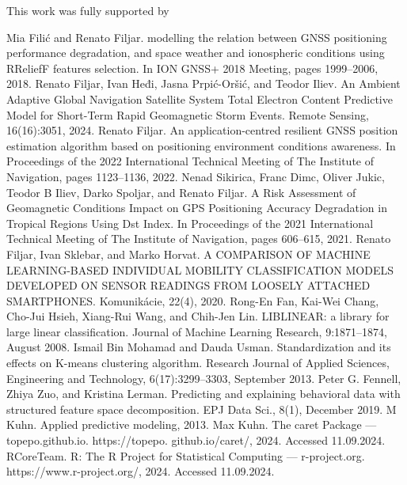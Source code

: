 \documentclass[preprint,12pt]{elsarticle}
\begin{document}
This work was fully supported by

\begin{thebibliography}{000}
 Mia Filić and Renato Filjar. modelling the relation between GNSS positioning performance degradation, and space weather and ionospheric conditions using RReliefF features selection. In ION GNSS+ 2018 Meeting, pages 1999–2006, 2018. 
 Renato Filjar, Ivan Heđi, Jasna Prpić-Oršić, and Teodor Iliev. An Ambient Adaptive Global Navigation Satellite System Total Electron Content Predictive Model for Short-Term Rapid Geomagnetic Storm Events. Remote Sensing, 16(16):3051, 2024. 
 Renato Filjar. An application-centred resilient GNSS position estimation algorithm based on positioning environment conditions awareness. In Proceedings of the 2022 International Technical Meeting of The Institute of Navigation, pages 1123–1136, 2022. 
 Nenad Sikirica, Franc Dimc, Oliver Jukic, Teodor B Iliev, Darko Spoljar, and Renato Filjar. A Risk Assessment of Geomagnetic Conditions Impact on GPS Positioning Accuracy Degradation in Tropical Regions Using Dst Index. In Proceedings of the 2021 International Technical Meeting of The Institute of Navigation, pages 606–615, 2021. 
 Renato Filjar, Ivan Sklebar, and Marko Horvat. A COMPARISON OF MACHINE LEARNING-BASED INDIVIDUAL MOBILITY CLASSIFICATION MODELS DEVELOPED ON SENSOR READINGS FROM LOOSELY ATTACHED SMARTPHONES. Komunikácie, 22(4), 2020. 
 Rong-En Fan, Kai-Wei Chang, Cho-Jui Hsieh, Xiang-Rui Wang, and Chih-Jen Lin. LIBLINEAR: a library for large linear classification. Journal of Machine Learning Research, 9:1871–1874, August 2008. 
 Ismail Bin Mohamad and Dauda Usman. Standardization and its effects on K-means clustering algorithm. Research Journal of Applied Sciences, Engineering and Technology, 6(17):3299–3303, September 2013. 
 Peter G. Fennell, Zhiya Zuo, and Kristina Lerman. Predicting and explaining behavioral data with structured feature space decomposition. EPJ Data Sci., 8(1), December 2019. 
 M Kuhn. Applied predictive modeling, 2013. 
 Max Kuhn. The caret Package — topepo.github.io. https://topepo. github.io/caret/, 2024. Accessed 11.09.2024. 
 RCoreTeam. R: The R Project for Statistical Computing — r-project.org. https://www.r-project.org/, 2024. Accessed 11.09.2024. 

\end{thebibliography}
\end{document}
